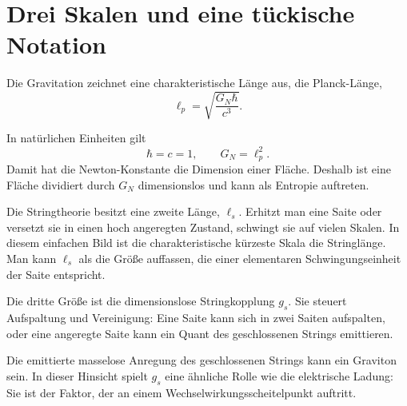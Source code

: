 \section{Drei Skalen und eine tückische Notation}

Die Gravitation zeichnet eine charakteristische Länge aus, die Planck-Länge,
\begin{equation}
\ell_p=\sqrt{\frac{G_N\hbar}{c^3}}.
\label{eq:l06-planck-si}
\end{equation}

\begin{classroomqa}\end{classroomqa}

In natürlichen Einheiten gilt
\begin{equation}
\hbar=c=1,
\qquad
G_N=\ell_p^2.
\label{eq:l06-planck-area}
\end{equation}
Damit hat die Newton-Konstante die Dimension einer Fläche. Deshalb ist eine Fläche dividiert durch \(G_N\) dimensionslos und kann als Entropie auftreten.

Die Stringtheorie besitzt eine zweite Länge, \(\ell_s\). Erhitzt man eine Saite oder versetzt sie in einen hoch angeregten Zustand, schwingt sie auf vielen Skalen. In diesem einfachen Bild ist die charakteristische kürzeste Skala die Stringlänge. Man kann \(\ell_s\) als die Größe auffassen, die einer elementaren Schwingungseinheit der Saite entspricht.

Die dritte Größe ist die dimensionslose Stringkopplung \(g_s\). Sie steuert Aufspaltung und Vereinigung: Eine Saite kann sich in zwei Saiten aufspalten, oder eine angeregte Saite kann ein Quant des geschlossenen Strings emittieren.

\begin{classroomqa}\end{classroomqa}

Die emittierte masselose Anregung des geschlossenen Strings kann ein Graviton sein. In dieser Hinsicht spielt \(g_s\) eine ähnliche Rolle wie die elektrische Ladung: Sie ist der Faktor, der an einem Wechselwirkungsscheitelpunkt auftritt.

